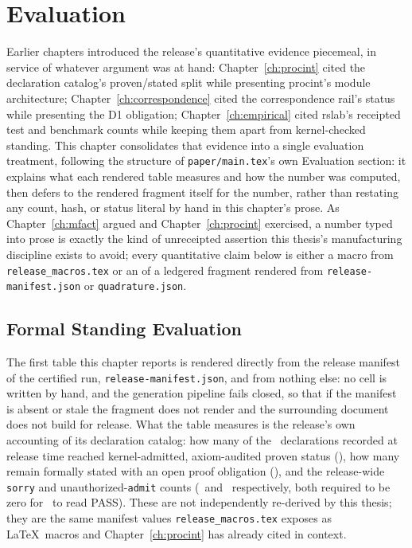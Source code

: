 \chapter{Evaluation}
\label{ch:evaluation}

Earlier chapters introduced the release's quantitative evidence
piecemeal, in service of whatever argument was at hand: Chapter~\ref{ch:procint}
cited the declaration catalog's proven/stated split while presenting
\textsf{procint}'s module architecture; Chapter~\ref{ch:correspondence}
cited the correspondence rail's status while presenting the D1 obligation;
Chapter~\ref{ch:empirical} cited rslab's receipted test and benchmark
counts while keeping them apart from kernel-checked standing. This
chapter consolidates that evidence into a single evaluation treatment,
following the structure of \texttt{paper/main.tex}'s own Evaluation
section: it explains what each rendered table measures and how the
number was computed, then defers to the rendered fragment itself for the
number, rather than restating any count, hash, or status literal by hand
in this chapter's prose. As Chapter~\ref{ch:mfact} argued and
Chapter~\ref{ch:procint} exercised, a number typed into prose is exactly
the kind of unreceipted assertion this thesis's manufacturing discipline
exists to avoid; every quantitative claim below is either a macro from
\texttt{release\_macros.tex} or an \verb|| of a ledgered fragment
rendered from \texttt{release-manifest.json} or \texttt{quadrature.json}.

\section{Formal Standing Evaluation}
\label{sec:eval-formal}

The first table this chapter reports is rendered directly from the
release manifest of the certified run, \texttt{release-manifest.json},
and from nothing else: no cell is written by hand, and the generation
pipeline fails closed, so that if the manifest is absent or stale the
fragment does not render and the surrounding document does not build for
release. What the table measures is the release's own accounting of its
declaration catalog: how many of the \TotalDecls\ declarations recorded
at release time reached kernel-admitted, axiom-audited proven status
(\KernelTheorems), how many remain formally stated with an open proof
obligation (\StatedCount), and the release-wide \texttt{sorry} and
unauthorized-\texttt{admit} counts (\SorryCount\ and \AdmitCount\
respectively, both required to be zero for \CertifiedStatus\ to read
PASS). These are not independently re-derived by this thesis; they are
the same manifest values \texttt{release\_macros.tex} exposes as
\LaTeX\ macros and Chapter~\ref{ch:procint} has already cited in context.


